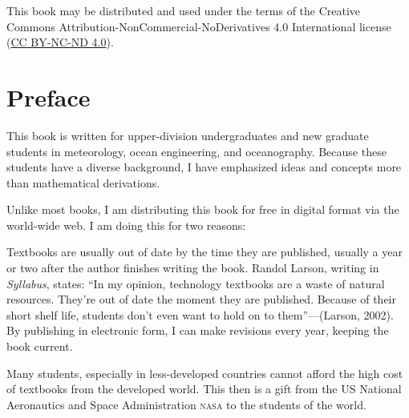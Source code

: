 
\vspace*{\fill}
\noindent{}This book may be distributed and used under the terms of the
Creative Commons Attribution-NonCommercial-NoDerivatives 4.0 International
license (\href{https://creativecommons.org/licenses/by-nc-nd/4.0/legalcode}{CC BY-NC-ND 4.0}).
\tableofcontents

\chapter{Preface}
This book is written for upper-division undergraduates and new
graduate students in meteorology, ocean engineering, and
oceanography. Because these students have a diverse background, I have
emphasized ideas and concepts more than mathematical derivations.

Unlike most books, I am distributing this book for free in digital
format via the world-wide web. I am doing this for two reasons:
\begin{enumerate}
\vitem Textbooks are usually out of date by the time they are
published, usually a year or two after the author finishes writing the
book. Randol Larson, writing in \textit{Syllabus}, states: ``In my
opinion, technology textbooks are a waste of natural
resources. They're out of date the moment they are published. Because
of their short shelf life, students don't even want to hold on to
them''---(Larson, 2002). By publishing in electronic form, I can make
revisions every year, keeping the book current.

\vitem Many students, especially in less-developed countries cannot
afford the high cost of textbooks from the developed world. This then
is a gift from the US National Aeronautics and Space Administration
\textsc{nasa} to the students of the world.
\end{enumerate} 

